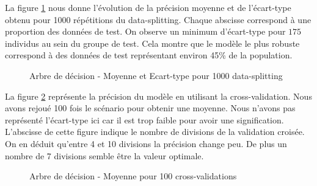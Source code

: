 \documentclass[11pt,a4paper]{article}
\begin{document}
			La figure \ref{data-splitting-dt} nous donne l'évolution de la précision moyenne et de l'écart-type obtenu pour 1000 répétitions du data-splitting. Chaque abscisse correspond à une proportion des données de test. On observe un minimum d'écart-type pour $175$ individus au sein du groupe de test. Cela montre que le modèle le plus robuste correspond à des données de test représentant environ 45\% de la population.

			\begin{figure}
				\caption{Arbre de décision - Moyenne et Ecart-type pour 1000 data-splitting}
				\label{data-splitting-dt}
			\end{figure}

			La figure \ref{cv_dt} représente la précision du modèle en utilisant la cross-validation. Nous avons rejoué 100 fois le scénario pour obtenir une moyenne. Nous n'avons pas représenté l'écart-type ici car il est trop faible pour avoir une signification. L'abscisse de cette figure indique le nombre de divisions de la validation croisée.
			On en déduit qu'entre 4 et 10 divisions la précision change peu. De plus un nombre de 7 divisions semble être la valeur optimale.

			\begin{figure}
			\begin{center}
				\caption{Arbre de décision - Moyenne pour 100 cross-validations}
				\label{cv_dt}
			\end{center}
			\end{figure}
\end{document}
